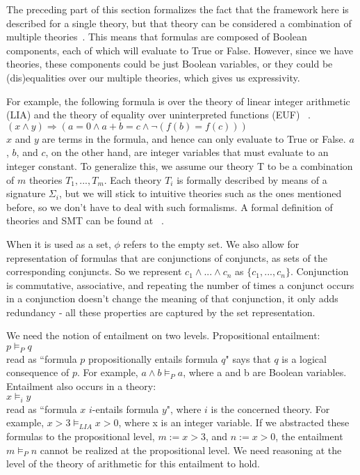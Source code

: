 \documentclass{article}
\begin{document}
\begin{framed}
The preceding part of this section formalizes the fact 
that the framework here is 
described for a single theory, but that theory can 
be considered a combination of multiple 
theories~\cite{Manna2003}. This means that formulas are 
composed of Boolean components, each of which will 
evaluate to True or False. However, since 
we have theories, these components could be just Boolean 
variables, or they could be (dis)equalities over our 
multiple theories, which gives us expressivity. 

For example, the following formula is over 
the theory of linear integer 
arithmetic (LIA) and the theory of 
equality over uninterpreted functions (EUF)
~\cite{LIAEUF}.\\
$(x \land y) \Rightarrow (a = 0 \land a + b = c \land 
\neg (f(b) = f(c)))$ \\
$x$ and $y$ are terms in the 
formula, and hence can only evaluate to True or False.
$a$, $b$, and $c$, on the other hand, are integer variables 
that must evaluate to an integer constant. To generalize 
this, we assume our theory T to be a combination of $m$ 
theories $T_1, ..., T_m$. Each theory $T_i$ is formally 
described by means of a signature $\Sigma_i$, but we 
will stick to intuitive theories such as the ones mentioned 
before, so we don't have to deal with such formalisms. A 
formal definition of theories and SMT can be found at 
~\cite{DBLP:reference/mc/BarrettT18}.
\end{framed}

When it is used as a set, $\phi$ refers to the empty set. We also allow for representation of formulas that are 
conjunctions of conjuncts, as sets of the corresponding 
conjuncts. So we represent $c_1 \land ... \land c_n$ as
$\{c_1, ..., c_n\}$. Conjunction is commutative, associative,
and repeating the number of times a conjunct occurs in a 
conjunction doesn't change the meaning of that conjunction, 
it only adds redundancy - all these properties are captured 
by the set representation.

We need the notion of entailment on two levels. Propositional 
entailment: \\
$p \models_P q$ \\
read as ``formula $p$ propositionally entails formula $q$" says 
that $q$ is a logical consequence of $p$. For example, 
$a \land b \models_P a$, where a and b are Boolean 
variables. Entailment also occurs in a theory: \\
$x \models_i y$ \\
read as ``formula $x$ $i$-entails formula $y$", where 
$i$ is the concerned theory. For example, 
$x > 3 \models_{LIA} x > 0$, where x is an integer variable.
If we abstracted these formulas to the propositional level, 
$m := x > 3$, and $n := x > 0$, 
the entailment $m \models_P n$ cannot be realized at the 
propositional level. We need reasoning at the level of 
the theory of arithmetic for this entailment to hold.
\end{document}
